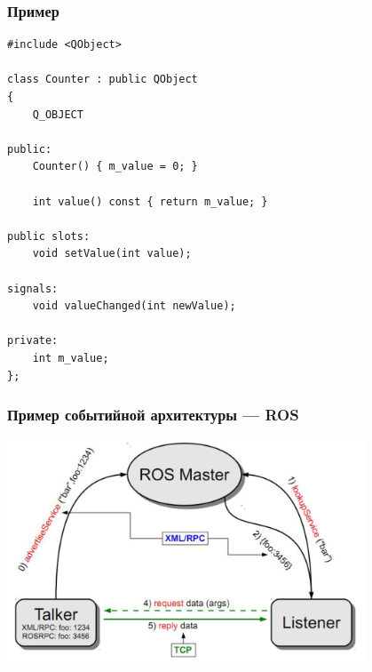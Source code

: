 \documentclass[xetex,mathserif,serif]{beamer}
\begin{document}
	\begin{frame}[fragile]
		\frametitle{Пример}
		\begin{scriptsize}
			\begin{verbatim}
#include <QObject>

class Counter : public QObject
{
    Q_OBJECT

public:
    Counter() { m_value = 0; }

    int value() const { return m_value; }

public slots:
    void setValue(int value);

signals:
    void valueChanged(int newValue);

private:
    int m_value;
};
			\end{verbatim}
		\end{scriptsize}
	\end{frame}

	\begin{frame}
		\frametitle{Пример событийной архитектуры --- ROS}
		\begin{center}
			\includegraphics[width=0.8\textwidth]{ros.png}
		\end{center}
	\end{frame}
\end{document}
